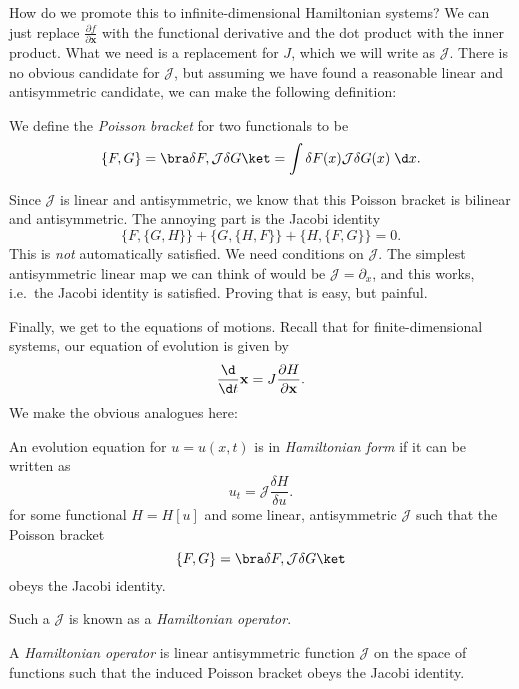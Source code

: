 \documentclass[a4paper]{article}
\begin{document}
How do we promote this to infinite-dimensional Hamiltonian systems? We can just replace $\frac{\partial f}{\partial \mathbf{x}}$ with the functional derivative and the dot product with the inner product. What we need is a replacement for $J$, which we will write as $\mathcal{J}$. There is no obvious candidate for $\mathcal{J}$, but assuming we have found a reasonable linear and antisymmetric candidate, we can make the following definition:

\begin{defi}
  We define the \emph{Poisson bracket} for two functionals to be
  \[
    \{F, G\} = \bra \delta F, \mathcal{J} \delta G\ket = \int \delta F(x) \mathcal{J} \delta G(x)\;\d x.
  \]
\end{defi}
Since $\mathcal{J}$ is linear and antisymmetric, we know that this Poisson bracket is bilinear and antisymmetric. The annoying part is the Jacobi identity
\[
  \{F, \{G, H\}\} + \{G, \{H, F\}\} + \{H, \{F, G\}\} = 0.
\]
This is \emph{not} automatically satisfied. We need conditions on $\mathcal{J}$. The simplest antisymmetric linear map we can think of would be $\mathcal{J} = \partial_x$, and this works, i.e.\ the Jacobi identity is satisfied. Proving that is easy, but painful.

Finally, we get to the equations of motions. Recall that for finite-dimensional systems, our equation of evolution is given by
\[
  \frac{\d}{\d t} \mathbf{x} = J \frac{\partial H}{\partial \mathbf{x}}.
\]
We make the obvious analogues here:
\begin{defi}
  An evolution equation for $u = u(x, t)$ is in \emph{Hamiltonian form} if it can be written as
  \[
    u_t = \mathcal{J} \frac{\delta H}{\delta u}.
  \]
  for some functional $H = H[u]$ and some linear, antisymmetric $\mathcal{J}$ such that the Poisson bracket
  \[
    \{F, G\} = \bra \delta F, \mathcal{J} \delta G\ket
  \]
  obeys the Jacobi identity.

\end{defi}

Such a $\mathcal{J}$ is known as a \emph{Hamiltonian operator}.
\begin{defi}
  A \emph{Hamiltonian operator} is linear antisymmetric function $\mathcal{J}$ on the space of functions such that the induced Poisson bracket obeys the Jacobi identity.
\end{defi}
\end{document}

